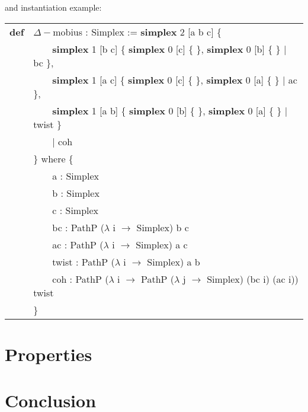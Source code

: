 \documentclass[a4paper,UKenglish,cleveref, autoref, thm-restate]{lipics-v2021}
\newcommand{\tabstyle}[0]{\scriptsize\ttfamily\fontseries{l}\selectfont}
\begin{document}
and instantiation example:

\begin{table}[ht]
\tabstyle
\begin{tabular}{rl}

\textbf{def} & $\Delta-$mobius : Simplex := \textbf{simplex} 2 [a b c] \{ \\
 &  \ \ \ \   \textbf{simplex} 1 [b c] \{ \textbf{simplex} 0 [c] \{ \}, \textbf{simplex} 0 [b] \{ \} | bc \}, \\
 &  \ \ \ \   \textbf{simplex} 1 [a c] \{ \textbf{simplex} 0 [c] \{ \}, \textbf{simplex} 0 [a] \{ \} | ac \}, \\
 &  \ \ \ \   \textbf{simplex} 1 [a b] \{ \textbf{simplex} 0 [b] \{ \}, \textbf{simplex} 0 [a] \{ \} | twist \} \\
 &  \ \ \ \ | coh \\
 & \} where \{ \\
 &  \ \ \ \  a : Simplex \\
 &  \ \ \ \  b : Simplex \\
 &  \ \ \ \  c : Simplex \\
 &  \ \ \ \  bc : PathP ($\lambda$ i $\rightarrow$ Simplex) b c \\
 &  \ \ \ \  ac : PathP ($\lambda$ i $\rightarrow$ Simplex) a c \\
 &  \ \ \ \  twist : PathP ($\lambda$ i $\rightarrow$ Simplex) a b \\
 &  \ \ \ \  coh : PathP ($\lambda$ i $\rightarrow$ PathP ($\lambda$ j $\rightarrow$ Simplex) (bc i) (ac i)) twist \\
 & \} 
\end{tabular}
\end{table}

\newpage
\section{Properties}

\section{Conclusion}


\end{document}
